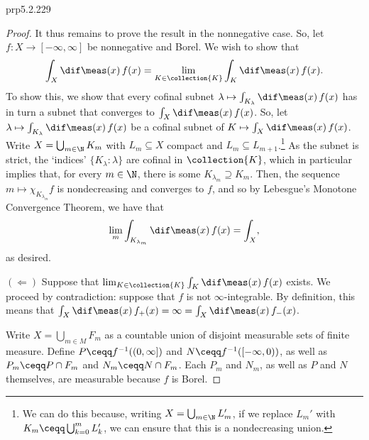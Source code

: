 \begin{thm}{}{prp5.2.229}
\begin{proof}
It thus remains to prove the result in the nonnegative case.  So, let $f\colon X\rightarrow [-\infty ,\infty ]$ be nonnegative and Borel.  We wish to show that
\begin{equation}
\int _X\dif \meas (x)\, f(x)=\lim _{K\in \collection{K}}\int _K\dif \meas (x)\, f(x).
\end{equation}
To show this, we show that every cofinal subnet $\lambda \mapsto \int _{K_{\lambda}}\dif \meas (x)\, f(x)$ has in turn a subnet that converges to $\int _X\dif \meas (x)\, f(x)$.  So, let $\lambda \mapsto \int _{K_{\lambda}}\dif \meas (x)\, f(x)$ be a cofinal subnet of $K\mapsto \int _X\dif \meas (x)\, f(x)$.  Write $X=\bigcup_{m\in \N}K_m$ with $L_m\subseteq X$ compact and $L_m\subseteq L_{m+1}$.\footnote{We can do this because, writing $X=\bigcup _{m\in \N}L_m'$, if we replace $L_m'$ with $K_m\ceqq \bigcup _{k=0}^mL_k'$, we can ensure that this is a nondecreasing union.}  As the subnet is strict, the `indices' $\{ K_{\lambda}:\lambda \}$ are cofinal in $\collection{K}$, which in particular implies that, for every $m\in \N$, there is some $K_{\lambda _m}\supseteq K_m$.  Then, the sequence $m\mapsto \chi _{K_{\lambda _m}}f$ is nondecreasing and converges to $f$, and so by Lebesgue's Monotone Convergence Theorem, we have that
\begin{equation}
\lim _m\int _{K_{\lambda _m}}\dif \meas (x)\, f(x)=\int _X,
\end{equation}
as desired.

\blankline
\noindent
$(\Leftarrow )$ Suppose that $\lim _{K\in \collection{K}}\int _K\dif \meas (x)\, f(x)$ exists.  We proceed by contradiction:  suppose that $f$ is not $\infty$-integrable.  By definition, this means that $\int _X\dif \meas (x)\, f_+(x)=\infty =\int _X\dif \meas (x)\, f_-(x)$.

Write $X=\bigcup _{m\in M}F_m$ as a countable union of disjoint measurable sets of finite measure.  Define $P\ceqq f^{-1}((0,\infty ])$ and $N\ceqq f^{-1}([-\infty ,0))$, as well as $P_m\ceqq P\cap F_m$ and $N_m\ceqq N\cap F_m$.  Each $P_m$ and $N_m$, as well as $P$ and $N$ themselves, are measurable because $f$ is Borel.


\end{proof}
\end{thm}
